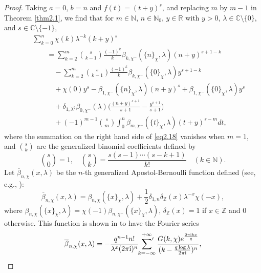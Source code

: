 \documentclass[10pt,a4paper]{amsart}
\begin{document}
\begin{proof} Taking $a=0$, $b=n$ and $f(t)=(t+y)^{s}$, and replacing $m$ by $m-1$ in Theorem \ref{thm2.1}, we find that for $m\in\mathbb{N}$, $n\in\mathbb{N}_{0}$, $y\in\mathbb{R}$ with $y>0$, $\lambda\in\mathbb{C}\setminus\{0\}$, and $s\in\mathbb{C}\setminus\{-1\}$,
\begin{eqnarray}\label{eq2.18}
&&\sum_{k=0}^{n}\chi(k)\lambda^{-k}(k+y)^{s}\nonumber\\
&&\qquad=\sum_{k=2}^{m}\binom{s}{k-1}\frac{(-1)^{k}}{k}\beta_{k,\chi^{-}}(\{n\}_{\chi},\lambda)(n+y)^{s+1-k}\nonumber\\
&&\qquad\quad-\sum_{k=2}^{m}\binom{s}{k-1}\frac{(-1)^{k}}{k}\beta_{k,\chi^{-}}(\{0\}_{\chi},\lambda)y^{s+1-k}\nonumber\\
&&\qquad\quad+\chi(0)y^{s}-\beta_{1,\chi^{-}}(\{n\}_{\chi},\lambda)(n+y)^{s}+\beta_{1,\chi^{-}}(\{0\}_{\chi},\lambda)y^{s}\nonumber\\
&&\qquad\quad+\delta_{1,\lambda^{q}}\beta_{0,\chi^{-}}(\lambda)\biggl(\frac{(n+y)^{s+1}}{s+1}-\frac{y^{s+1}}{s+1}\biggl)\nonumber\\
&&\qquad\quad+(-1)^{m-1}\binom{s}{m}\int_{0}^{n}\beta_{m,\chi^{-}}(\{t\}_{\chi},\lambda)(t+y)^{s-m}dt,
\end{eqnarray}
where the summation on the right hand side of \eqref{eq2.18} vanishes when $m=1$, and $\binom{s}{k}$ are the generalized binomial coefficients defined by
\begin{equation*}
\binom{s}{0}=1,\quad\binom{s}{k}=\frac{s(s-1)\cdots(s-k+1)}{k!}\quad(k\in\mathbb{N}).
\end{equation*}
Let $\overline{\beta}_{n,\chi}(x,\lambda)$ be the $n$-th generalized Apostol-Bernoulli function defined (see, e.g., \cite[Definition 2.7]{he}):
\begin{equation}\label{eq2.19}
\overline{\beta}_{n,\chi}(x,\lambda)=\beta_{n,\chi}(\{x\}_{\chi},\lambda)+\frac{1}{2}\delta_{1,n}\delta_{\mathbb{Z}}(x)\lambda^{-x}\chi(-x),
\end{equation}
where $\beta_{n,\chi}(\{x\}_{\chi},\lambda)=\chi(-1)\beta_{n,\chi^{-}}(\{x\}_{\chi},\lambda)$, $\delta_{\mathbb{Z}}(x)=1$ if $x\in\mathbb{Z}$ and $0$ otherwise. This function is shown in \cite[Theorem 3.1]{he} to have the Fourier series
\begin{equation}\label{eq2.20}
\overline{\beta}_{n,\chi}(x,\lambda)=-\frac{q^{n-1}n!}{\lambda^{x}(2\pi \mathrm{i})^{n}}\sideset{}{'}\sum_{k=-\infty}^{+\infty}\frac{G(k,\chi)e^{\frac{2\pi\mathrm{i}kx}{q}}}{(k-\frac{q\log\lambda}{2\pi\mathrm{i}})^{n}},
\end{equation}

\end{proof}
\end{document}
